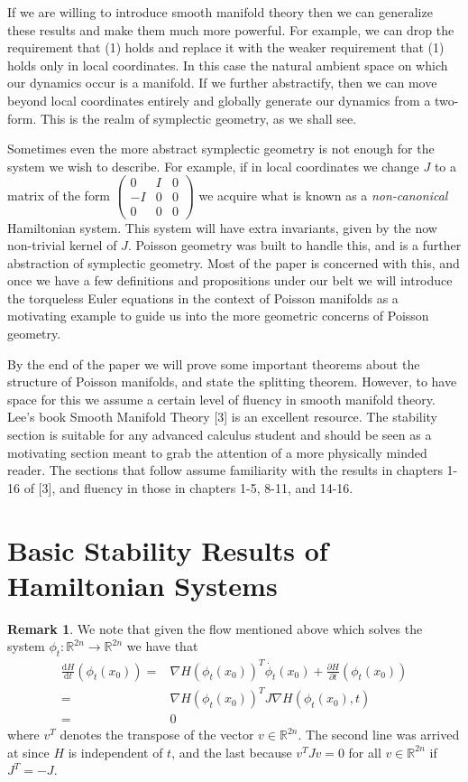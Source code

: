 \documentclass[psamsfonts,12pt]{amsart}
\newcommand\td{\mathrm{d}}
\newcommand\0{\mathbf{0}}
\theoremstyle{plain}
\theoremstyle{definition}
\newtheorem{rmk}[thm]{Remark}
\newcommand{\bbR}{\mathbb{R}}
\begin{document}
If we are willing to introduce smooth manifold theory then we can generalize these results and make them much more powerful.  For example, we can drop the requirement that (1) holds and replace it with the weaker requirement that (1) holds only in local coordinates.  In this case the natural ambient space on which our dynamics occur is a manifold.  If we further abstractify, then we can move beyond local coordinates entirely and globally generate our dynamics from a two-form.  This is the realm of symplectic geometry, as we shall see.

Sometimes even the more abstract symplectic geometry is not enough for the system we wish to describe.  For example, if in local coordinates we change $J$ to a matrix of the form $\begin{pmatrix} 0& I& 0\\ -I& 0& 0\\ 0& 0& 0\end{pmatrix}$ we acquire what is known as a \textit{non-canonical} Hamiltonian system.  This system will have extra invariants, given by the now non-trivial kernel of $J$.  Poisson geometry was built to handle this, and is a further abstraction of symplectic geometry.  Most of the paper is concerned with this, and once we have a few definitions and propositions under our belt we will introduce the torqueless Euler equations in the context of Poisson manifolds as a motivating example to guide us into the more geometric concerns of Poisson geometry.


By the end of the paper we will prove some important theorems about the structure of Poisson manifolds, and state the splitting theorem.  However, to have space for this we assume a certain level of fluency in smooth manifold theory.  Lee's book Smooth Manifold Theory [3] is an excellent resource.  The stability section is suitable for any advanced calculus student and should be seen as a motivating section meant to grab the attention of a more physically minded reader.  The sections that follow assume familiarity with the results in chapters 1-16 of [3], and fluency in those in chapters 1-5, 8-11, and 14-16.



\section{Basic Stability Results of Hamiltonian Systems}
\begin{rmk}
We note that given the flow mentioned above which solves the system $\phi_t \colon \bbR^{2n}\rightarrow \bbR^{2n}$ we have that
\begin{align*}
\frac{\td H}{\td t}(\phi_t(x_0))=& \nabla H(\phi_t(x_0))^T \dot{\phi_t}(x_0)+\frac{\partial H}{\partial t}(\phi_t(x_0))\\
=& \nabla H(\phi_t(x_0))^TJ\nabla H(\phi_t(x_0),t)\\
=& 0 
\end{align*}
where $v^T$ denotes the transpose of the vector $v\in \bbR^{2n}$.  The second line was arrived at since $H$ is independent of $t$, and the last because $v^TJv=0$ for all $v\in \bbR^{2n}$ if $J^T=-J$.
\end{rmk}
\end{document}
